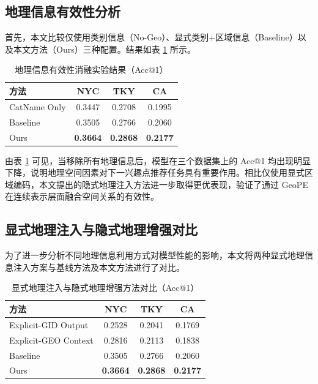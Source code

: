 \subsection{地理信息有效性分析}

首先，本文比较仅使用类别信息（No-Geo）、显式类别+区域信息（Baseline）以及本文方法（Ours）三种配置。结果如表 \ref{tab:ablation_geo} 所示。

\begin{table}[htbp]
\centering
\caption{地理信息有效性消融实验结果（Acc@1）}
\label{tab:ablation_geo}
\begin{tabular}{lccc}
\toprule
方法 & NYC & TKY & CA \\
\midrule
CatName Only & 0.3447 & 0.2708 & 0.1995 \\
Baseline & 0.3505 & 0.2766 & 0.2060 \\
Ours & \textbf{0.3664} & \textbf{0.2868} & \textbf{0.2177} \\
\bottomrule
\end{tabular}
\end{table}

由表 \ref{tab:ablation_geo} 可见，当移除所有地理信息后，模型在三个数据集上的 Acc@1 均出现明显下降，说明地理空间因素对下一兴趣点推荐任务具有重要作用。相比仅使用显式区域编码，本文提出的隐式地理注入方法进一步取得更优表现，验证了通过 GeoPE 在连续表示层面融合空间关系的有效性。

\subsection{显式地理注入与隐式地理增强对比}
\label{sec:explicit_vs_implicit}

为了进一步分析不同地理信息利用方式对模型性能的影响，本文将两种显式地理信息注入方案与基线方法及本文方法进行了对比。

\begin{table}[htbp]
\centering
\caption{显式地理注入与隐式地理增强方法对比（Acc@1）}
\label{tab:explicit_implicit_compare}
\begin{tabular}{lccc}
\toprule
方法 & NYC & TKY & CA \\
\midrule
Explicit-GID Output & 0.2528 & 0.2041 & 0.1769 \\
Explicit-GEO Context & 0.2816 & 0.2113 & 0.1838 \\
Baseline & 0.3505 & 0.2766 & 0.2060 \\
Ours & \textbf{0.3664} & \textbf{0.2868} & \textbf{0.2177} \\
\bottomrule
\end{tabular}
\end{table}

